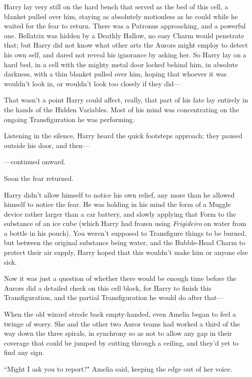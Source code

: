 \later

Harry lay very still on the hard bench that served as the bed of this cell, a blanket pulled over him, staying as absolutely motionless as he could while he waited for the fear to return. There was a Patronus approaching, and a powerful one. Bellatrix was hidden by a Deathly Hallow, no easy Charm would penetrate that; but Harry did not know what other arts the Aurors might employ to detect his own self, and dared not reveal his ignorance by asking her. So Harry lay on a hard bed, in a cell with the mighty metal door locked behind him, in absolute darkness, with a thin blanket pulled over him, hoping that whoever it was wouldn't look in, or wouldn't look too closely if they did---

That wasn't a point Harry could affect, really, that part of his fate lay entirely in the hands of the Hidden Variables. Most of his mind was concentrating on the ongoing Transfiguration he was performing.

Listening in the silence, Harry heard the quick footsteps approach; they paused outside his door, and then---

---continued onward.

Soon the fear returned.

Harry didn't allow himself to notice his own relief, any more than he allowed himself to notice the fear. He was holding in his mind the form of a Muggle device rather larger than a car battery, and slowly applying that Form to the substance of an ice cube (which Harry had frozen using \emph{Frigideiro} on water from a bottle in his pouch). You weren't supposed to Transfigure things to be burned, but between the original substance being water, and the Bubble-Head Charm to protect their air supply, Harry hoped that this wouldn't make him or anyone else sick.

Now it was just a question of whether there would be enough time before the Aurors did a detailed check on this cell block, for Harry to finish this Transfiguration, and the partial Transfiguration he would do after that---

\later

When the old wizard strode back empty-handed, even Amelia began to feel a twinge of worry. She and the other two Auror teams had worked a third of the way down the three spirals, in synchrony so as not to allow any gap in their coverage that could be jumped by cutting through a ceiling, and they'd yet to find any sign.

``Might I ask you to report?" Amelia said, keeping the edge out of her voice.

